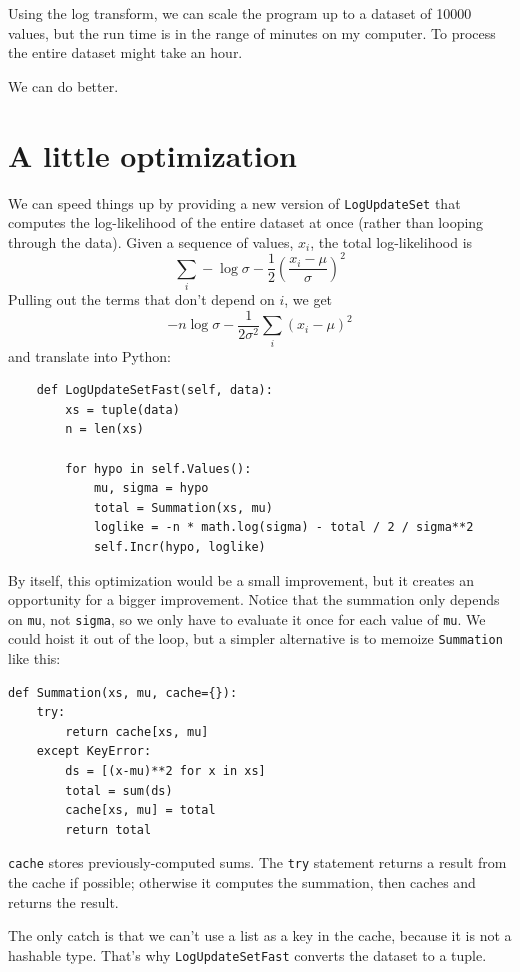 \documentclass[12pt]{book}
\begin{document}
Using the log transform, we can scale the program up to a dataset
of 10000 values, but the run time is in the range of minutes on
my computer.  To process the entire dataset might take an hour.

We can do better.


\section{A little optimization}

We can speed things up by providing a new version of \verb"LogUpdateSet"
that computes the log-likelihood of the entire dataset at once (rather
than looping through the data).  Given a sequence of values, $x_i$,
the total log-likelihood is
%
\[ \sum_i -\log \sigma - \frac{1}{2} \left( \frac{x_i-\mu}{\sigma} \right)^2 \]
%
Pulling out the terms that don't depend on $i$, we get
%
\[ -n \log \sigma - \frac{1}{2 \sigma^2} \sum_i \left( x_i-\mu \right)^2 \]
%
and translate into Python:

\begin{verbatim}
    def LogUpdateSetFast(self, data):
        xs = tuple(data)
        n = len(xs)

        for hypo in self.Values():
            mu, sigma = hypo
            total = Summation(xs, mu)
            loglike = -n * math.log(sigma) - total / 2 / sigma**2
            self.Incr(hypo, loglike)
\end{verbatim}

By itself, this optimization would be a small improvement, but it
creates an opportunity for a bigger improvement.  Notice that the
summation only depends on {\tt mu}, not {\tt sigma}, so we only
have to evaluate it once for each value of {\tt mu}.  We could hoist
it out of the loop, but a simpler alternative is to memoize
{\tt Summation} like this:

\begin{verbatim}
def Summation(xs, mu, cache={}):
    try:
        return cache[xs, mu]
    except KeyError:
        ds = [(x-mu)**2 for x in xs]
        total = sum(ds)
        cache[xs, mu] = total
        return total
\end{verbatim}

{\tt cache} stores previously-computed sums.  The {\tt try} statement
returns a result from the cache if possible; otherwise it computes
the summation, then caches and returns the result.

The only catch is that we can't use a list as a key in the cache, because
it is not a hashable type.  That's why {\tt LogUpdateSetFast} converts
the dataset to a tuple.
\end{document}
